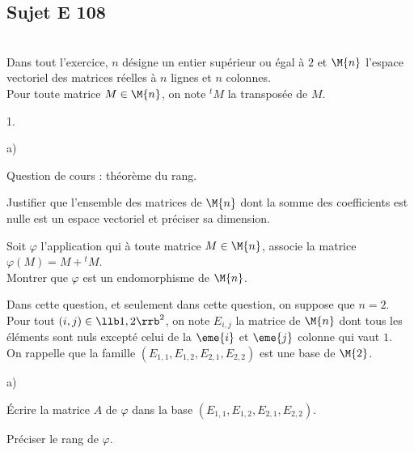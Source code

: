 \documentclass[11pt]{article}%
\begin{document}
\newpage


\subsection*{Sujet E 108}


\begin{exerciceAP}~\\
  Dans tout l'exercice, $n$ désigne un entier supérieur ou égal à $2$ 
  et $\M{n}$ l'espace vectoriel des matrices réelles à $n$ lignes 
  et $n$ colonnes.\\
  Pour toute matrice $M \in \M{n}$, on note ${}^t M$ la transposée
  de $M$.
  \begin{noliste}{1.}
    \setlength{\itemsep}{2mm}
    \item 
    \begin{noliste}{a)}
    \setlength{\itemsep}{2mm}
      \item Question de cours : théorème du rang.
      \item Justifier que l'ensemble des matrices de $\M{n}$ dont la 
      somme des coefficients est nulle est un espace vectoriel 
      et préciser sa dimension.
    \end{noliste}
    
    \item Soit $\varphi$ l'application qui à toute matrice $M\in \M{n}$,
    associe la matrice $\varphi(M) = M + {}^t M$.\\
    Montrer que $\varphi$ est un endomorphisme de $\M{n}$.
    
    \item Dans cette question, et seulement dans cette question, on 
    suppose que $n=2$.\\
    Pour tout $(i,j) \in \llb 1,2 \rrb^2$, on note $E_{i,j}$ la 
    matrice de $\M{n}$ dont tous les éléments sont nuls excepté celui
    de la $\eme{i}$ et $\eme{j}$ colonne qui vaut $1$.\\
    On rappelle que la famille $(E_{1,1}, E_{1,2}, E_{2,1}, E_{2,2})$
    est une base de $\M{2}$.
    \begin{noliste}{a)}
    \setlength{\itemsep}{2mm}
      \item Écrire la matrice $A$ de $\varphi$ dans la base $(E_{1,1},
      E_{1,2}, E_{2,1}, E_{2,2})$.
      
      \item Préciser le rang de $\varphi$.
      

\end{noliste}
\end{noliste}
\end{exerciceAP}
\end{document}
